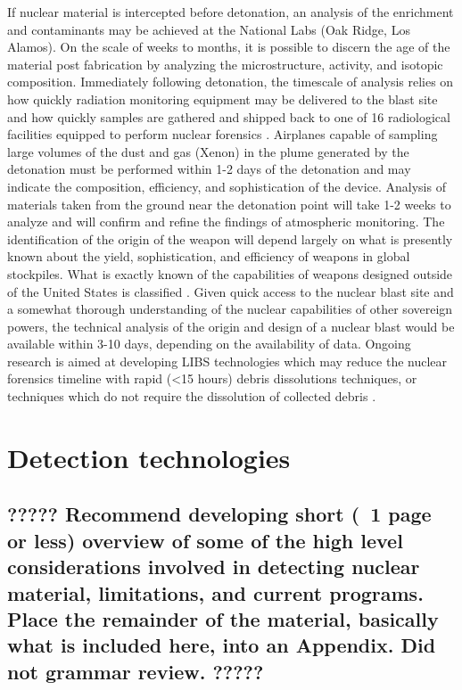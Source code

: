 \documentclass{report}
\begin{document}
If nuclear material is intercepted before detonation, an analysis of the enrichment and contaminants may be achieved at the National Labs (Oak Ridge, Los Alamos). On the scale of weeks to months, it is possible to discern the age of the material post fabrication by analyzing the microstructure, activity, and isotopic composition. Immediately following detonation, the timescale of analysis relies on how quickly radiation monitoring equipment may be delivered to the blast site and how quickly samples are gathered and shipped back to one of 16 radiological facilities equipped to perform nuclear forensics \cite{1446400}. Airplanes capable of sampling large volumes of the dust and gas (Xenon) in the plume generated by the detonation must be performed within 1-2 days of the detonation and may indicate the composition, efficiency, and sophistication of the device. Analysis of materials taken from the ground near the detonation point will take 1-2 weeks to analyze and will confirm and refine the findings of atmospheric monitoring. The identification of the origin of the weapon will depend largely on what is presently known about the yield, sophistication, and efficiency of weapons in global stockpiles. What is exactly known of the capabilities of weapons designed outside of the United States is classified \cite{Glasstone_1964}. Given quick access to the nuclear blast site and a somewhat thorough understanding of the nuclear capabilities of other sovereign powers, the technical analysis of the origin and design of a nuclear blast would be available within 3-10 days, depending on the availability of data. Ongoing research is aimed at developing LIBS technologies which may reduce the nuclear forensics timeline with rapid (\textless 15 hours) debris dissolutions techniques, or techniques which do not require the dissolution of collected debris \cite{Condron}. 


\section{Detection technologies }

\subsection{????? Recommend developing short (~1 page or less) overview of some of the high level considerations involved in detecting nuclear material, limitations, and current programs.  Place the remainder of the material, basically what is included here, into an Appendix.  Did not grammar review.   ?????}
\end{document}
